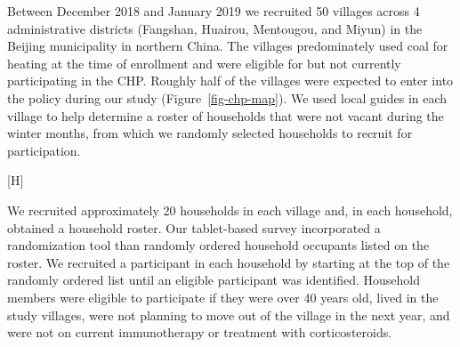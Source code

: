 \documentclass[
  letterpaper,
  DIV=11,
  numbers=noendperiod]{scrartcl}
\makeatletter
\renewenvironment{figure}%
   {\renewcommand\familydefault\sfdefault
    \@float{figure}}
   {\end@float}
\makeatother
\begin{document}
Between December 2018 and January 2019 we recruited 50 villages across 4
administrative districts (Fangshan, Huairou, Mentougou, and Miyun) in
the Beijing municipality in northern China. The villages predominately
used coal for heating at the time of enrollment and were eligible for
but not currently participating in the CHP. Roughly half of the villages
were expected to enter into the policy during our study 
(Figure~\ref{fig-chp-map}). We used local guides in each village to help
determine a roster of households that were not vacant during the winter
months, from which we randomly selected households to recruit for
participation.

\begin{figure}[H]


\caption{\label{fig-chp-map}Map of village implementation of CHP. Each
circle represents one recruited village. The colors of the circles
indicate the year the villages were exposed to the household energy
transition policy.}

\end{figure}%

We recruited approximately 20 households in each village and, in each
household, obtained a household roster. Our  tablet-based
survey incorporated a randomization tool than randomly ordered household
occupants listed on the roster. We recruited a participant in each
household by starting at the top of the randomly ordered list until an
eligible participant was identified. Household members were eligible to
participate if they were over 40 years old, lived in the study villages,
were not planning to move out of the village in the next year, and were
not on current immunotherapy or treatment with corticosteroids.
\end{document}
